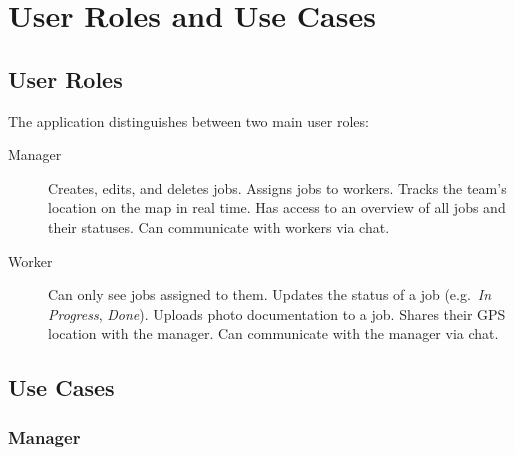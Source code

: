 \chapter{User Roles and Use Cases}

\section{User Roles}

The application distinguishes between two main user roles:

\begin{description}
  \item[Manager] Creates, edits, and deletes jobs. Assigns jobs to workers. Tracks the team's location on the map in real time. Has access to an overview of all jobs and their statuses. Can communicate with workers via chat.

  \item[Worker] Can only see jobs assigned to them. Updates the status of a job (e.g.\ \textit{In Progress}, \textit{Done}). Uploads photo documentation to a job. Shares their GPS location with the manager. Can communicate with the manager via chat.
\end{description}

\section{Use Cases}

\subsection{Manager}

